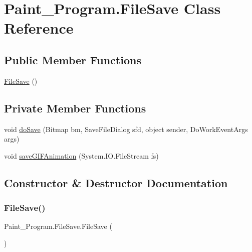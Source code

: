 \hypertarget{class_paint___program_1_1_file_save}{}\section{Paint\+\_\+\+Program.\+File\+Save Class Reference}
\label{class_paint___program_1_1_file_save}
\subsection*{Public Member Functions}
\begin{DoxyCompactItemize}
\item 
\mbox{\hyperlink{class_paint___program_1_1_file_save_a8f1d802c4dccb8b60bd56c723348d8e8}{File\+Save}} ()
\end{DoxyCompactItemize}
\subsection*{Private Member Functions}
\begin{DoxyCompactItemize}
\item 
void \mbox{\hyperlink{class_paint___program_1_1_file_save_ad180b279d4ba8813fa777acd386665ac}{do\+Save}} (Bitmap bm, Save\+File\+Dialog sfd, object sender, Do\+Work\+Event\+Args args)
\item 
void \mbox{\hyperlink{class_paint___program_1_1_file_save_a2ca61f0383c371f649c95825d40795f6}{save\+G\+I\+F\+Animation}} (System.\+I\+O.\+File\+Stream fs)
\end{DoxyCompactItemize}


\subsection{Constructor \& Destructor Documentation}
\mbox{\label{class_paint___program_1_1_file_save_a8f1d802c4dccb8b60bd56c723348d8e8}} 
\subsubsection{\texorpdfstring{File\+Save()}{FileSave()}}
{\footnotesize\ttfamily Paint\+\_\+\+Program.\+File\+Save.\+File\+Save (\begin{DoxyParamCaption}{ }\end{DoxyParamCaption})\hspace{0.3cm}{\ttfamily [inline]}}



